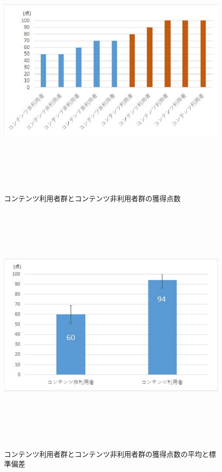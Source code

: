 \begin{figure}[htbp]
    \begin{center}
        \includegraphics[width=13cm,height=12cm,keepaspectratio]{result_all-crop.pdf}\\
    \end{center}
    \caption{コンテンツ利用者群とコンテンツ非利用者群の獲得点数}
    \label{result_all}
\end{figure}
\newpage
\begin{figure}[htbp]
    \begin{center}
        \includegraphics[width=13cm,height=12cm,keepaspectratio]{result-crop.pdf}\\
    \end{center}
    \caption{コンテンツ利用者群とコンテンツ非利用者群の獲得点数の平均と標準偏差}
    \label{result_avg}
\end{figure}

